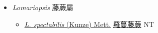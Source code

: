 
  \begin{itemize}
 \item[] \textit{Lomariopsis} 藤蕨屬
                    
  \begin{itemize}
        \item[] \href{http://www.theplantlist.org/tpl1.1/search?q=Lomariopsis+spectabilis}{\textit{L. spectabilis} (Kunze) Mett.}   \href{\detokenize{http://taibnet.sinica.edu.tw/chi/taibnet_species_list.php?T2=羅蔓藤蕨&T2_new_value=true&fr=y}}{羅蔓藤蕨} NT
  \end{itemize}
  \end{itemize}
